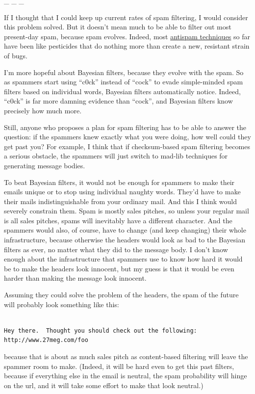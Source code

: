 \documentclass[12pt]{book}
\begin{document}
\_ \_ \_

If I thought that I could keep up current rates of spam filtering, I
would consider this problem solved. But it doesn't mean much to be able
to filter out most present-day spam, because spam evolves. Indeed, most
\href{falsepositives.html}{antispam techniques} so far have been like
pesticides that do nothing more than create a new, resistant strain of
bugs.

I'm more hopeful about Bayesian filters, because they evolve with the
spam. So as spammers start using ``c0ck'' instead of ``cock'' to evade
simple-minded spam filters based on individual words, Bayesian filters
automatically notice. Indeed, ``c0ck'' is far more damning evidence than
``cock'', and Bayesian filters know precisely how much more.

Still, anyone who proposes a plan for spam filtering has to be able to
answer the question: if the spammers knew exactly what you were doing,
how well could they get past you? For example, I think that if
checksum-based spam filtering becomes a serious obstacle, the spammers
will just switch to mad-lib techniques for generating message bodies.

To beat Bayesian filters, it would not be enough for spammers to make
their emails unique or to stop using individual naughty words. They'd
have to make their mails indistinguishable from your ordinary mail. And
this I think would severely constrain them. Spam is mostly sales
pitches, so unless your regular mail is all sales pitches, spams will
inevitably have a different character. And the spammers would also, of
course, have to change (and keep changing) their whole infrastructure,
because otherwise the headers would look as bad to the Bayesian filters
as ever, no matter what they did to the message body. I don't know
enough about the infrastructure that spammers use to know how hard it
would be to make the headers look innocent, but my guess is that it
would be even harder than making the message look innocent.

Assuming they could solve the problem of the headers, the spam of the
future will probably look something like this:

\begin{verbatim}

Hey there.  Thought you should check out the following:
http://www.27meg.com/foo
\end{verbatim}

because that is about as much sales pitch as content-based filtering
will leave the spammer room to make. (Indeed, it will be hard even to
get this past filters, because if everything else in the email is
neutral, the spam probability will hinge on the url, and it will take
some effort to make that look neutral.)
\end{document}
